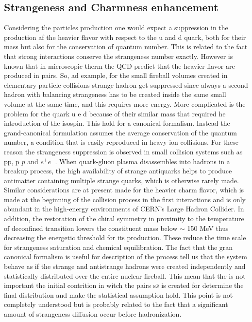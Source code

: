 \documentclass[12pt,a4paper]{book}
\begin{document}
	\subsection{Strangeness and Charmness enhancement}
	Considering the particles production one would expect a suppression in the production af the heavier flavor with respect to the u and d quark, both for their mass but also for the conservation of quantum number. This is related to the fact that strong interactions conserve the strangeness number exactly. However is known that in microscopic therm the QCD predict that the heavier flavor are produced in pairs. So, ad example, for the small fireball volumes created in elementary particle collisions strange hadron get suppressed since always a second hadron with balancing strangeness has to be created inside the same small volume at the same time, and this requires more energy. More complicated is the problem for the quark u e d because of their similar mass that required he introduction of the isospin. This hold for a canonical formalism. Instead the grand-canonical formulation assumes the average conservation of the quantum number, a condition that is easily reproduced in heavy-ion collisions. For these reason the strangeness suppression is observed in small collision systems such as pp, p $\bar{p}$ and $e^+ e^-$. When quark-gluon plasma disassembles into hadrons in a breakup process, the high availability of strange antiquarks helps to produce antimatter containing multiple strange quarks, which is otherwise rarely made. Similar considerations are at present made for the heavier charm flavor, which is made at the beginning of the collision process in the first interactions and is only abundant in the high-energy environments of CERN's Large Hadron Collider. In addition, the restoration of the chiral symmetry in proximity to the temperature of deconfined transition lowers the constituent mass below $\sim$ 150 MeV thus decreasing the energetic threshold for its production. These reduce the time scale for strangeness saturation and chemical equilibration. The fact that the gran canonical formalism is useful for description of the process tell us that the system behave as if the strange and antistrange hadrons were created independently and statistically distributed over the entire nuclear fireball. This mean that the is not important the initial contrition in witch the pairs s$\bar{s}$ is created for determine the final distribution and make the statistical assumption hold. This point is not completely understood but is probably related to the fact that a significant amount of strangeness diffusion occur before hadronization.
	
\end{document}
